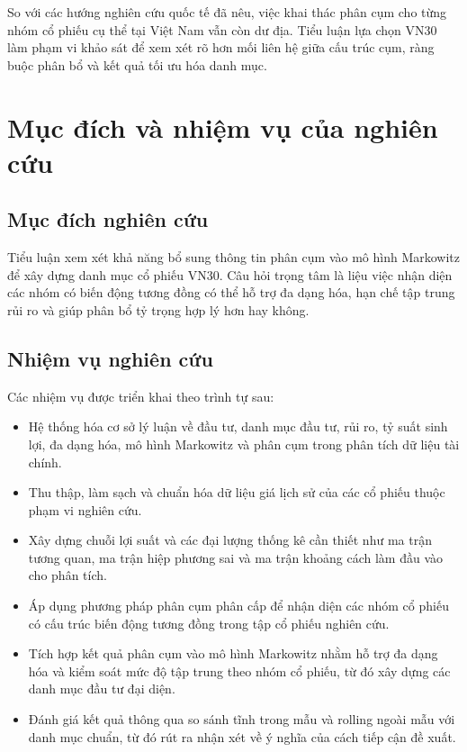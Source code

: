 \documentclass[12pt,a4paper,openany,oneside]{book}
\begin{document}
So với các hướng nghiên cứu quốc tế đã nêu, việc khai thác phân cụm cho từng nhóm cổ phiếu cụ thể tại Việt Nam vẫn còn dư địa. Tiểu luận lựa chọn VN30 làm phạm vi khảo sát để xem xét rõ hơn mối liên hệ giữa cấu trúc cụm, ràng buộc phân bổ và kết quả tối ưu hóa danh mục.

\section{Mục đích và nhiệm vụ của nghiên cứu}\label{Toc227188413}
\subsection{Mục đích nghiên cứu}
Tiểu luận xem xét khả năng bổ sung thông tin phân cụm vào mô hình Markowitz để xây dựng danh mục cổ phiếu VN30. Câu hỏi trọng tâm là liệu việc nhận diện các nhóm có biến động tương đồng có thể hỗ trợ đa dạng hóa, hạn chế tập trung rủi ro và giúp phân bổ tỷ trọng hợp lý hơn hay không.

\subsection{Nhiệm vụ nghiên cứu}
Các nhiệm vụ được triển khai theo trình tự sau:

\begin{itemize}
\item Hệ thống hóa cơ sở lý luận về đầu tư, danh mục đầu tư, rủi ro, tỷ suất sinh lợi, đa dạng hóa, mô hình Markowitz và phân cụm trong phân tích dữ liệu tài chính.

\item Thu thập, làm sạch và chuẩn hóa dữ liệu giá lịch sử của các cổ phiếu thuộc phạm vi nghiên cứu.

\item Xây dựng chuỗi lợi suất và các đại lượng thống kê cần thiết như ma trận tương quan, ma trận hiệp phương sai và ma trận khoảng cách làm đầu vào cho phân tích.

\item Áp dụng phương pháp phân cụm phân cấp để nhận diện các nhóm cổ phiếu có cấu trúc biến động tương đồng trong tập cổ phiếu nghiên cứu.

\item Tích hợp kết quả phân cụm vào mô hình Markowitz nhằm hỗ trợ đa dạng hóa và kiểm soát mức độ tập trung theo nhóm cổ phiếu, từ đó xây dựng các danh mục đầu tư đại diện.

\item Đánh giá kết quả thông qua so sánh tĩnh trong mẫu và rolling ngoài mẫu với danh mục chuẩn, từ đó rút ra nhận xét về ý nghĩa của cách tiếp cận đề xuất.
\end{itemize}
\end{document}
